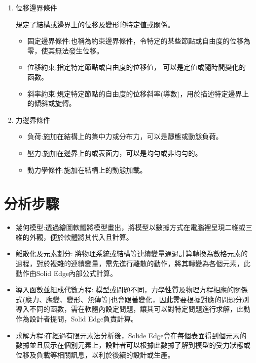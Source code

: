 \begin{enumerate}
\item 位移邊界條件

規定了結構或邊界上的位移及變形的特定值或關係。\\

\begin{itemize}
\item 固定邊界條件:也稱為約束邊界條件，令特定的某些節點或自由度的位移為零，使其無法發生位移。
\item 位移約束:指定特定節點或自由度的位移值， 可以是定值或隨時間變化的函數。
\item 斜率約束:規定特定節點的自由度的位移斜率(導數)，用於描述特定邊界上的傾斜或旋轉。
\end{itemize}

\item 力邊界條件

\begin{itemize}
規定了結構或邊界上施加的外部力或力的分布。\\
\item 負荷:施加在結構上的集中力或分布力，可以是靜態或動態負荷。\\
\item 壓力:施加在邊界上的或表面力，可以是均勻或非均勻的。\\
\item 動力學條件:施加在結構上的動態加載。\\
\end{itemize}

\end{enumerate}
\newpage

\section{分析步驟}
\begin{itemize}
\item 幾何模型:透過繪圖軟體將模型畫出，將模型以數據方式在電腦裡呈現二維或三維的外觀，便於軟體將其代入且計算。
\item 離散化及元素劃分: 將物理系統或結構等連續變量通過計算轉換為數格元素的過程，對於複雜的連續變量，需先進行離散的動作，將其轉變為各個元素，此動作由Solid Edge內部公式計算。
\item 導入函數並組成代數方程: 模型或問題不同，力學性質及物理方程相應的關係式(應力、應變、變形、熱傳等)也會跟著變化，因此需要根據對應的問題分別導入不同的函數，需在軟體內設定問題，讓其可以對特定問題進行求解，此動作為設計者提問，Solid Edge負責計算。
\item 求解方程:在經過有限元素法分析後，Solide Edge會在每個表面得到個元素的數據並且展示在個別元素上，設計者可以根據此數據了解到模型的受力狀態或位移及負載等相關訊息，以利於後續的設計或生產。
\end{itemize}
\newpage
